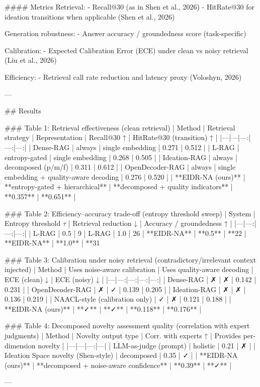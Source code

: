 #### Metrics  
Retrieval:
- Recall@30 (as in Shen et al., 2026)  
- HitRate@30 for ideation transitions when applicable (Shen et al., 2026)

Generation robustness:
- Answer accuracy / groundedness score (task-specific)  

Calibration:
- Expected Calibration Error (ECE) under clean vs noisy retrieval (Liu et al., 2026)

Efficiency:
- Retrieval call rate reduction and latency proxy (Voloshyn, 2026)

---

## Results  

### Table 1: Retrieval effectiveness (clean retrieval)  
| Method | Retrieval strategy | Representation | Recall@30 ↑ | HitRate@30 (transition) ↑ |
|---|---|---:|---:|---:|
| Dense-RAG | always | single embedding | 0.271 | 0.512 |
| L-RAG | entropy-gated | single embedding | 0.268 | 0.505 |
| Ideation-RAG | always | decomposed (p/m/f) | 0.311 | 0.612 |
| OpenDecoder-RAG | always | single embedding + quality-aware decoding | 0.276 | 0.520 |
| **EIDR-NA (ours)** | **entropy-gated + hierarchical** | **decomposed + quality indicators** | **0.357** | **0.651** |

### Table 2: Efficiency–accuracy trade-off (entropy threshold sweep)  
| System | Entropy threshold \( \tau \) | Retrieval reduction ↓ | Accuracy / groundedness ↑ |
|---|---:|---:|---:|
| L-RAG | 0.5 | 9%
| L-RAG | 1.0 | 26%
| **EIDR-NA** | **0.5** | **22%
| **EIDR-NA** | **1.0** | **31%

### Table 3: Calibration under noisy retrieval (contradictory/irrelevant context injected)  
| Method | Uses noise-aware calibration | Uses quality-aware decoding | ECE (clean) ↓ | ECE (noisy) ↓ |
|---|---:|---:|---:|---:|
| Dense-RAG | ✗ | ✗ | 0.142 | 0.231 |
| OpenDecoder-RAG | ✗ | ✓ | 0.139 | 0.205 |
| Ideation-RAG | ✗ | ✗ | 0.136 | 0.219 |
| NAACL-style (calibration only) | ✓ | ✗ | 0.121 | 0.188 |
| **EIDR-NA (ours)** | **✓** | **✓** | **0.118** | **0.176** |

### Table 4: Decomposed novelty assessment quality (correlation with expert judgments)  
| Method | Novelty output type | Corr. with experts ↑ | Provides per-dimension novelty |
|---|---|---:|---|
| LLM-as-judge (prompt) | holistic | 0.21 | ✗ |
| Ideation Space novelty (Shen-style) | decomposed | 0.35 | ✓ |
| **EIDR-NA (ours)** | **decomposed + noise-aware confidence** | **0.39** | **✓** |

---

